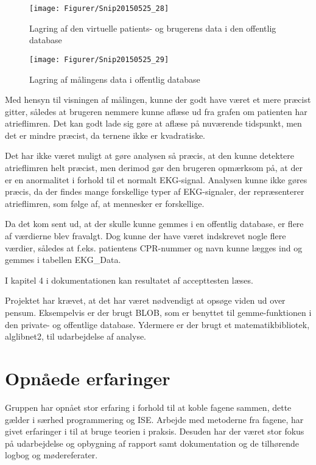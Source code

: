 \begin{figure}[H]
	\centering
	\texttt{[image: Figurer/Snip20150525\_28]}
	\caption{Lagring af den virtuelle patients- og brugerens data i den offentlig database}
\end{figure}

\begin{figure}[H]
	\centering
	\texttt{[image: Figurer/Snip20150525\_29]}
	\caption{Lagring af målingens data i offentlig database}
\end{figure}

Med hensyn til visningen af målingen, kunne der godt have været et mere præcist gitter, således at brugeren nemmere kunne aflæse ud fra grafen om patienten har atrieflimren. Det kan godt lade sig gøre at aflæse på nuværende tidspunkt, men det er mindre præcist, da ternene ikke er kvadratiske.

Det har ikke været muligt at gøre analysen så præcis, at den kunne detektere atrieflimren helt præcist, men derimod gør den brugeren opmærksom på, at der er en anormalitet i forhold til et normalt EKG-signal. Analysen kunne ikke gøres præcis, da der findes mange forskellige typer af EKG-signaler, der repræsenterer atrieflimren, som følge af, at mennesker er forskellige.

Da det kom sent ud, at der skulle kunne gemmes i en offentlig database, er flere af værdierne blev fravalgt. Dog kunne der have været indskrevet nogle flere værdier, således at f.eks. patientens CPR-nummer og navn kunne lægges ind og gemmes i tabellen EKG\_Data.

I kapitel 4 i dokumentationen kan resultatet af accepttesten læses.

Projektet har krævet, at det har været nødvendigt at opsøge viden ud over pensum. Eksempelvis er der brugt BLOB, som er benyttet til gemme-funktionen i den private- og offentlige database. Ydermere er der brugt et matematikbibliotek, alglibnet2, til udarbejdelse af analyse.

\section{Opnåede erfaringer}
Gruppen har opnået stor erfaring i forhold til at koble fagene sammen, dette gælder i særhed programmering og ISE. Arbejde med metoderne fra fagene, har givet erfaringer i til at bruge teorien i praksis. Desuden har der været stor fokus på udarbejdelse og opbygning af rapport samt dokumentation og de tilhørende logbog og mødereferater. 

